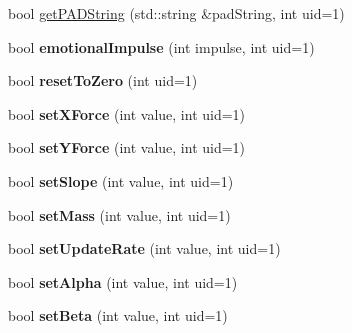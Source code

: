 \begin{DoxyCompactItemize}
\item 
bool \hyperlink{class_w_a_s_a_b_i_engine_ab36d4f1e86abe80bc29a636641995d74}{get\-P\-A\-D\-String} (std\-::string \&pad\-String, int uid=1)
\item 
\hypertarget{class_w_a_s_a_b_i_engine_aa1f6c88567e14b2f8e18c20682d95555}{
bool {\bfseries emotional\-Impulse} (int impulse, int uid=1)}
\label{class_w_a_s_a_b_i_engine_aa1f6c88567e14b2f8e18c20682d95555}

\item 
\hypertarget{class_w_a_s_a_b_i_engine_aad56212e9e16d3aca7c93184e22ea527}{
bool {\bfseries reset\-To\-Zero} (int uid=1)}
\label{class_w_a_s_a_b_i_engine_aad56212e9e16d3aca7c93184e22ea527}

\item 
\hypertarget{class_w_a_s_a_b_i_engine_a6ef66887c993bd63b413186e8164830b}{
bool {\bfseries set\-X\-Force} (int value, int uid=1)}
\label{class_w_a_s_a_b_i_engine_a6ef66887c993bd63b413186e8164830b}

\item 
\hypertarget{class_w_a_s_a_b_i_engine_a65f302732da8469c219752b118861d99}{
bool {\bfseries set\-Y\-Force} (int value, int uid=1)}
\label{class_w_a_s_a_b_i_engine_a65f302732da8469c219752b118861d99}

\item 
\hypertarget{class_w_a_s_a_b_i_engine_ac02ba44929c3f3c3c43a8b192736e39c}{
bool {\bfseries set\-Slope} (int value, int uid=1)}
\label{class_w_a_s_a_b_i_engine_ac02ba44929c3f3c3c43a8b192736e39c}

\item 
\hypertarget{class_w_a_s_a_b_i_engine_aaf3be59b72800f2b6d4e036c12206308}{
bool {\bfseries set\-Mass} (int value, int uid=1)}
\label{class_w_a_s_a_b_i_engine_aaf3be59b72800f2b6d4e036c12206308}

\item 
\hypertarget{class_w_a_s_a_b_i_engine_a21e4b22ca625bb3cb0944be3fe4d57b1}{
bool {\bfseries set\-Update\-Rate} (int value, int uid=1)}
\label{class_w_a_s_a_b_i_engine_a21e4b22ca625bb3cb0944be3fe4d57b1}

\item 
\hypertarget{class_w_a_s_a_b_i_engine_aad9d281c287559ba4efeae7ae1ed3dbb}{
bool {\bfseries set\-Alpha} (int value, int uid=1)}
\label{class_w_a_s_a_b_i_engine_aad9d281c287559ba4efeae7ae1ed3dbb}

\item 
\hypertarget{class_w_a_s_a_b_i_engine_aef5549ff1ae5cebe145a3ab2fd46d598}{
bool {\bfseries set\-Beta} (int value, int uid=1)}
\label{class_w_a_s_a_b_i_engine_aef5549ff1ae5cebe145a3ab2fd46d598}


\end{DoxyCompactItemize}

